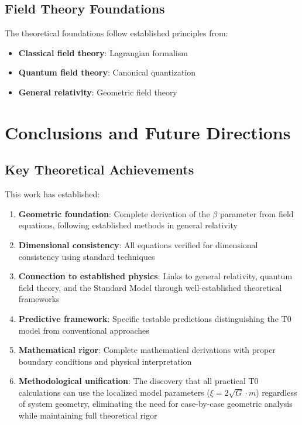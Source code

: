 \documentclass[12pt,a4paper]{article}
\begin{document}
	\subsection{Field Theory Foundations}
	\label{subsec:field_theory_foundations}
	
	The theoretical foundations follow established principles from:
	\begin{itemize}
		\item \textbf{Classical field theory}: Lagrangian formalism \citep{goldstein2001,landau1975}
		\item \textbf{Quantum field theory}: Canonical quantization \citep{peskin1995,weinberg1995}
		\item \textbf{General relativity}: Geometric field theory \citep{misner1973,carroll2004}
	\end{itemize}
	
	\section{Conclusions and Future Directions}
	\label{sec:conclusions}
	
	\subsection{Key Theoretical Achievements}
	\label{subsec:key_achievements}
	
	This work has established:
	\begin{enumerate}
		\item \textbf{Geometric foundation}: Complete derivation of the $\beta$ parameter from field equations, following established methods in general relativity \citep{misner1973,carroll2004}
		
		\item \textbf{Dimensional consistency}: All equations verified for dimensional consistency using standard techniques \citep{barenblatt1996}
		
		\item \textbf{Connection to established physics}: Links to general relativity, quantum field theory, and the Standard Model through well-established theoretical frameworks
		
		\item \textbf{Predictive framework}: Specific testable predictions distinguishing the T0 model from conventional approaches
		
		\item \textbf{Mathematical rigor}: Complete mathematical derivations with proper boundary conditions and physical interpretation
		
		\item \textbf{Methodological unification}: The discovery that all practical T0 calculations can use the localized model parameters ($\xi = 2\sqrt{G} \cdot m$) regardless of system geometry, eliminating the need for case-by-case geometric analysis while maintaining full theoretical rigor
	\end{enumerate}
	
\end{document}
